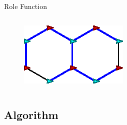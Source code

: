 \begin{frame}{Role Function}
\begin{columns}[T]
\begin{column}{.5\textwidth}
      \begin{figure}
        \centering
        \includegraphics[scale=0.8]{figs/good-hexagon}
        \end{figure}
    \end{column}%
  \end{columns}
\end{frame}


\subsection{Algorithm}
